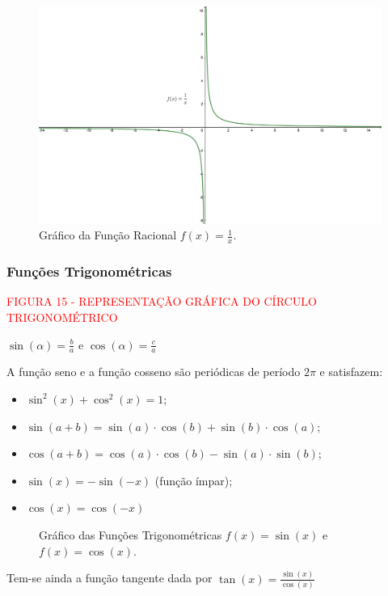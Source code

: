 \documentclass[oneside,a4paper,12pt]{article}
\begin{document}
\begin{figure}[h!]
		\centering
		\includegraphics[width=0.7\linewidth]{Figuras/racional}
		\caption{Gráfico da Função Racional $f(x) = \displaystyle \frac{1}{x}$.}
\end{figure}

\subsubsection{Funções Trigonométricas}
\vspace{150pt}
\begin{center}
	\textcolor{red}{FIGURA 15 - REPRESENTAÇÃO GRÁFICA DO CÍRCULO TRIGONOMÉTRICO}
\end{center}

$\sin (\alpha) = \frac{b}{a}$ e $\cos(\alpha) = \frac{c}{a}$

A função seno e a função cosseno são periódicas de período $2\pi$ e satisfazem:
\begin{itemize}
	\item $\sin^{2}(x) + \cos^{2}(x) = 1$;
	\item $\sin(a+b) = \sin(a) \cdot \cos(b) + \sin(b) \cdot \cos(a)$;
	\item $\cos(a+b) = \cos(a) \cdot \cos(b) - \sin(a) \cdot \sin(b)$;
	\item $\sin(x) = - \sin(-x)$ (função ímpar);
	\item $\cos(x) = \cos(-x)$
\end{itemize}


\begin{figure}[!h]
	\centering
	\caption{Gráfico das Funções Trigonométricas $f(x) = \sin(x)$ e $f(x) = \cos(x)$.}
\end{figure}


Tem-se ainda a função tangente dada por $\tan(x) = \frac{\sin(x)}{\cos(x)}$
\end{document}
